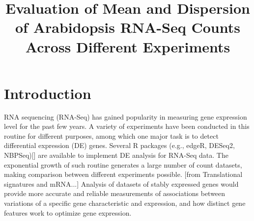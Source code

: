 \documentclass[paper=a4, fontsize=12.5pt]{scrartcl} %
\title{Evaluation of Mean and Dispersion of Arabidopsis RNA-Seq Counts Across Different Experiments}
\date{} %
\numberwithin{equation}{section} %
\numberwithin{figure}{section} %
\numberwithin{table}{section} %
\begin{document}
\maketitle


\section{Introduction}
RNA sequencing (RNA-Seq) has gained {} popularity in measuring gene  expression level for the past few years. A variety of experiments  have been conducted in this routine for {} different purposes, among which one major task is to detect differential expression (DE) genes. Several R packages (e.g., edgeR, DESeq2, NBPSeq)[{\color{green}{reference needed}}] are available to implement DE analysis for RNA-Seq data. The exponential growth of such routine generates a large number of count datasets, making comparison between different experiments possible. 
[from Translational signatures and mRNA...]
Analysis of datasets of stably expressed genes would provide more accurate and reliable measurements of associations between variations of a specific gene characteristic and expression, and how distinct gene features work to optimize gene expression.
\end{document}
